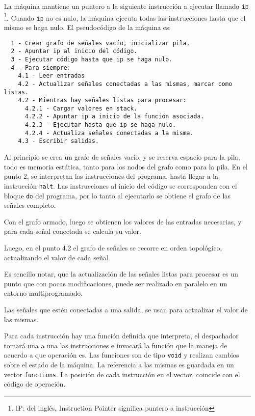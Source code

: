   La máquina mantiene un puntero a la siguiente instrucción a ejecutar llamado
  \texttt{ip} \footnote{IP: del inglés, Instruction Pointer significa puntero a instrucción}.
  Cuando \texttt{ip} no es nulo, la máquina ejecuta todas las instrucciones hasta
  que el mismo se haga nulo.
  El pseudocódigo de la máquina es:

\begin{Verbatim}
  1 - Crear grafo de señales vacío, inicializar pila.
  2 - Apuntar ip al inicio del código.
  3 - Ejecutar código hasta que ip se haga nulo.
  4 - Para siempre:
    4.1 - Leer entradas
    4.2 - Actualizar señales conectadas a las mismas, marcar como listas.
    4.2 - Mientras hay señales listas para procesar:
      4.2.1 - Cargar valores en stack.
      4.2.2 - Apuntar ip a inicio de la función asociada.
      4.2.3 - Ejecutar hasta que ip se haga nulo.
      4.2.4 - Actualiza señales conectadas a la misma.
    4.3 - Escribir salidas.
\end{Verbatim}

  Al principio se crea un grafo de señales vacío, y se reserva espacio para la pila, todo es memoria estática, tanto
  para los nodos del grafo como para la pila.
  En el punto 2, se interpretan las instrucciones del programa, hasta llegar a la instrucción \texttt{halt}. Las 
  instrucciones al inicio del código se corresponden con el bloque \texttt{do} del programa, por lo tanto
  al ejecutarlo se obtiene el grafo de las señales completo.

  Con el grafo armado, luego se obtienen los valores de las entradas
necesarias, y para cada señal conectada se calcula su valor.

  Luego, en el punto 4.2 el grafo de señales se recorre en orden
topológico, actualizando el valor de cada señal.

  Es sencillo notar, que la actualización de las señales listas para
procesar es un punto que con pocas modificaciones, puede ser realizado
en paralelo en un entorno multiprogramado.

  Las señales que estén conectadas a una salida, se usan para actualizar el valor de las mismas.

  Para cada instrucción hay una función definida que interpreta, el despachador
  tomará una a una las instrucciones e invocará la función que la maneja de acuerdo
  a que operación es.
  Las funciones son de tipo \texttt{void} y realizan cambios sobre el estado
  de la máquina. La referencia a las mismas es guardada en un vector \texttt{functions}.
  La posición de cada instrucción en el vector, coincide con el código de operación.

